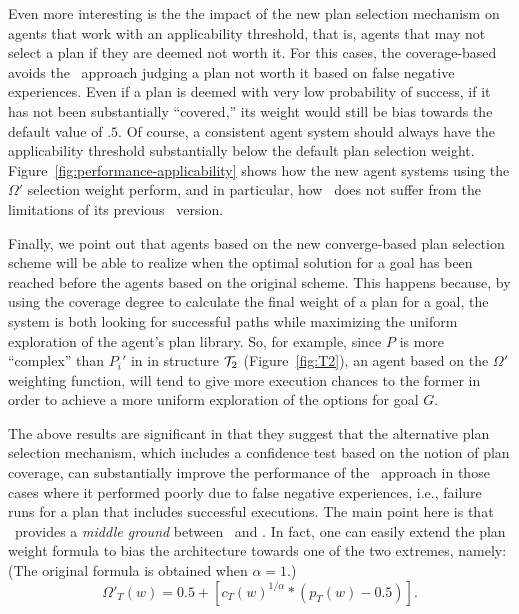 Even more interesting is the the impact of the new plan selection mechanism on
agents that work with an applicability threshold, that is, agents that may not
select a plan if they are deemed not worth it. For this cases, the coverage-based
avoids the \CL\ approach judging a plan not worth it based on false negative
experiences. Even if a plan is deemed with very low probability of success, if it
has not been substantially ``covered,'' its weight would still be bias towards the
default value of $.5$. Of course, a consistent agent system should always have
the applicability threshold substantially below the default plan selection
weight.
Figure~\ref{fig:performance-applicability} shows how the new agent systems
using the $\Omega'$ selection weight perform, and in particular, how \CLSELB\
does not suffer from the limitations of its previous \CLSELA\ version.


Finally, we point out that agents based on the new converge-based plan selection
scheme will be able to realize when the optimal solution for a goal has been
reached before the agents based on the original scheme.
This happens because, by using the coverage degree to calculate the final weight
of a plan for a goal, the system is both looking for successful paths while
maximizing    the uniform exploration of the agent's plan library.
So, for example, since $P$ is more ``complex'' than $P_i'$ in in structure ${\mathcal{T}}_2$
(Figure~\ref{fig:T2}), an agent based on the $\Omega'$ weighting function, will
tend to give more execution chances to the former in order to achieve a more
uniform exploration of the options for goal $G$.



 

The above results are significant in that they suggest that the alternative plan
selection mechanism, which includes a confidence test based on the notion of plan
coverage, can substantially improve the performance of the \CL\ approach in those
cases where it performed poorly due to false negative experiences, i.e., failure
runs for a plan that includes successful executions.
The main point here is that \CLSELB\ provides a \emph{middle ground} between
\CLSELA\ and \BULSELA. In fact, one can easily extend the plan weight formula to
bias the architecture towards one of the two extremes, namely: (The
original formula is obtained when $\alpha=1$.)
\begin{equation*}\label{eqn:coverage*}   
\Omega'_T(w) = 0.5 + \left[  c_T(w)^{1/\alpha} *  \left( p_T(w) - 0.5 \right) 
\right].
\end{equation*}

